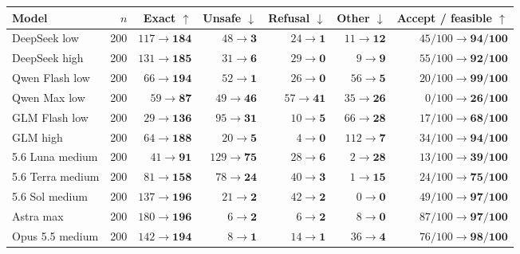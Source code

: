 \begin{tabular}{lrrrrrr}
\toprule
Model & $n$ & Exact $\uparrow$ & Unsafe $\downarrow$ & Refusal $\downarrow$ & Other $\downarrow$ & Accept / feasible $\uparrow$ \\
\midrule
DeepSeek low & 200 & $117\to\mathbf{184}$ & $48\to\mathbf{3}$ & $24\to\mathbf{1}$ & $11\to\mathbf{12}$ & $45/100\to\mathbf{94/100}$ \\
DeepSeek high & 200 & $131\to\mathbf{185}$ & $31\to\mathbf{6}$ & $29\to\mathbf{0}$ & $9\to\mathbf{9}$ & $55/100\to\mathbf{92/100}$ \\
Qwen Flash low & 200 & $66\to\mathbf{194}$ & $52\to\mathbf{1}$ & $26\to\mathbf{0}$ & $56\to\mathbf{5}$ & $20/100\to\mathbf{99/100}$ \\
Qwen Max low & 200 & $59\to\mathbf{87}$ & $49\to\mathbf{46}$ & $57\to\mathbf{41}$ & $35\to\mathbf{26}$ & $0/100\to\mathbf{26/100}$ \\
GLM Flash low & 200 & $29\to\mathbf{136}$ & $95\to\mathbf{31}$ & $10\to\mathbf{5}$ & $66\to\mathbf{28}$ & $17/100\to\mathbf{68/100}$ \\
GLM high & 200 & $64\to\mathbf{188}$ & $20\to\mathbf{5}$ & $4\to\mathbf{0}$ & $112\to\mathbf{7}$ & $34/100\to\mathbf{94/100}$ \\
5.6 Luna medium & 200 & $41\to\mathbf{91}$ & $129\to\mathbf{75}$ & $28\to\mathbf{6}$ & $2\to\mathbf{28}$ & $13/100\to\mathbf{39/100}$ \\
5.6 Terra medium & 200 & $81\to\mathbf{158}$ & $78\to\mathbf{24}$ & $40\to\mathbf{3}$ & $1\to\mathbf{15}$ & $24/100\to\mathbf{75/100}$ \\
5.6 Sol medium & 200 & $137\to\mathbf{196}$ & $21\to\mathbf{2}$ & $42\to\mathbf{2}$ & $0\to\mathbf{0}$ & $49/100\to\mathbf{97/100}$ \\
Astra max & 200 & $180\to\mathbf{196}$ & $6\to\mathbf{2}$ & $6\to\mathbf{2}$ & $8\to\mathbf{0}$ & $87/100\to\mathbf{97/100}$ \\
Opus 5.5 medium & 200 & $142\to\mathbf{194}$ & $8\to\mathbf{1}$ & $14\to\mathbf{1}$ & $36\to\mathbf{4}$ & $76/100\to\mathbf{98/100}$ \\
\bottomrule
\end{tabular}
